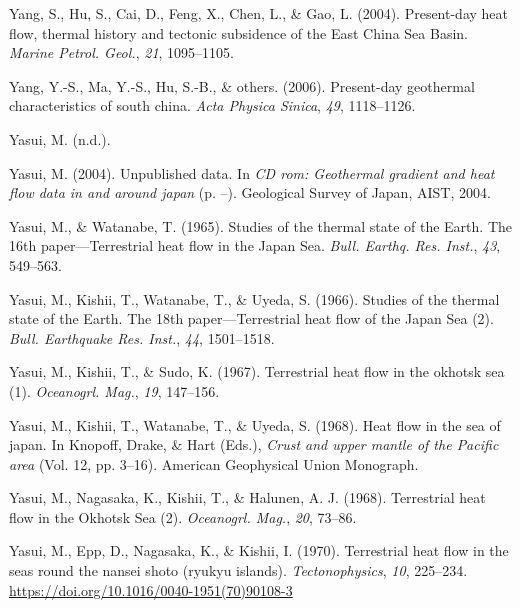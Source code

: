 \documentclass[draft,linenumbers]{agujournal2018}
\begin{document}
\leavevmode{}%
Yang, S., Hu, S., Cai, D., Feng, X., Chen, L., \& Gao, L. (2004).
Present-day heat flow, thermal history and tectonic subsidence of the
{East China Sea Basin}. \emph{Marine Petrol. Geol.}, \emph{21},
1095--1105.

\leavevmode{}%
Yang, Y.-S., Ma, Y.-S., Hu, S.-B., \& others. (2006). Present-day
geothermal characteristics of south china. \emph{Acta Physica Sinica},
\emph{49}, 1118--1126.

\leavevmode{}%
Yasui, M. (n.d.).

\leavevmode{}%
Yasui, M. (2004). Unpublished data. In \emph{CD rom: Geothermal gradient
and heat flow data in and around japan} (p. --). Geological Survey of
Japan, AIST, 2004.

\leavevmode{}%
Yasui, M., \& Watanabe, T. (1965). Studies of the thermal state of the
{Earth}. {The 16th paper---Terrestrial heat flow in the Japan Sea}.
\emph{Bull. Earthq. Res. Inst.}, \emph{43}, 549--563.

\leavevmode{}%
Yasui, M., Kishii, T., Watanabe, T., \& Uyeda, S. (1966). Studies of the
thermal state of the {Earth}. {The 18th paper---Terrestrial heat flow of
the Japan Sea (2)}. \emph{Bull. Earthquake Res. Inst.}, \emph{44},
1501--1518.

\leavevmode{}%
Yasui, M., Kishii, T., \& Sudo, K. (1967). Terrestrial heat flow in the
okhotsk sea (1). \emph{Oceanogrl. Mag.}, \emph{19}, 147--156.

\leavevmode{}%
Yasui, M., Kishii, T., Watanabe, T., \& Uyeda, S. (1968). Heat flow in
the sea of japan. In Knopoff, Drake, \& Hart (Eds.), \emph{Crust and
upper mantle of the {Pacific} area} (Vol. 12, pp. 3--16). American
Geophysical Union Monograph.

\leavevmode{}%
Yasui, M., Nagasaka, K., Kishii, T., \& Halunen, A. J. (1968).
Terrestrial heat flow in the {Okhotsk Sea (2)}. \emph{Oceanogrl. Mag.},
\emph{20}, 73--86.

\leavevmode{}%
Yasui, M., Epp, D., Nagasaka, K., \& Kishii, I. (1970). Terrestrial heat
flow in the seas round the nansei shoto (ryukyu islands).
\emph{Tectonophysics}, \emph{10}, 225--234.
\url{https://doi.org/10.1016/0040-1951(70)90108-3}
\end{document}
